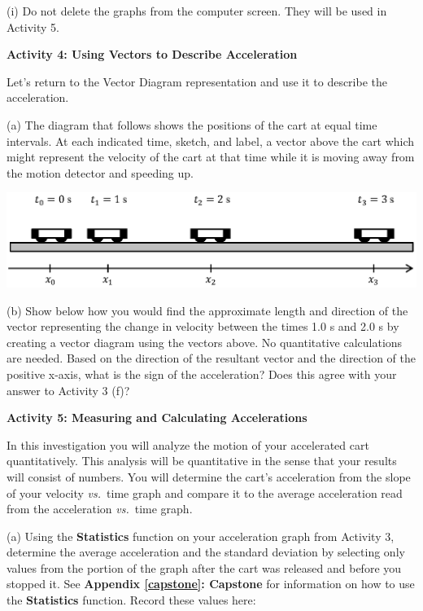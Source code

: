 (i) Do not delete the graphs from the computer screen.  They will be used in Activity 5.
\vspace{10mm}

\textbf{Activity 4: Using Vectors to Describe Acceleration} 

Let's return to the Vector Diagram representation and use it to describe the
acceleration.

(a) The diagram that follows shows the positions of the cart at equal time intervals.
At each indicated time, sketch, and label, a vector above the cart which might represent
the velocity of the cart at that time while it is moving away from the motion
detector and speeding up.

\vspace{0.3cm}
{\par\centering \includegraphics{changing/carts_const_a.eps} \par}
\vspace{0.3cm}

(b) Show below how you would find the approximate length and direction of the
vector representing the change in velocity between the times 1.0 s and 2.0 s
by creating a vector diagram using the vectors above. No quantitative 
calculations are needed. Based on the direction of the resultant vector and 
the direction of the positive x-axis, what is the sign of the acceleration? 
Does this agree with your answer to Activity 3 (f)?
\answerspace{20mm}

\textbf{Activity 5: Measuring and Calculating Accelerations}

In this investigation you will analyze the motion of your accelerated cart quantitatively.
This analysis will be quantitative in the sense that your results will consist
of numbers. You will determine the cart's acceleration from the slope of your
velocity \textit{vs.}~time graph and compare it to the average acceleration read from
the acceleration \textit{vs.}~time graph. 

(a) Using the \textbf{Statistics} function on your acceleration graph from Activity 3, determine the average acceleration and the standard deviation by selecting only values from the portion of the graph after the cart was released and before you stopped it. See \textbf{Appendix \ref{capstone}: Capstone} for information on how to use the \textbf{Statistics} function. Record these values here:
\answerspace{20mm}

